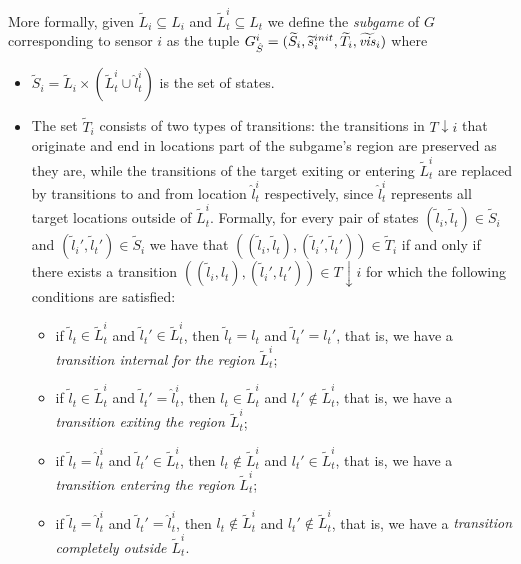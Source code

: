 More formally, given $\widetilde{L}_i \subseteq L_i$ and  $\widetilde{L}^i_t \subseteq L_t$ we define the \emph{subgame} of $G$ corresponding to sensor $i$ as the tuple $G^{i}_{\hat{S}} = (\widetilde{S}_i,\widetilde{s}_i^{init},\widetilde{T}_i,\widetilde{\mathit{vis}}_i)$  where 
\begin{itemize}
\item $\widetilde{S}_i= \widetilde{L}_i \times (\widetilde{L}^i_t \cup \hat{l}^i_t)$ is the set of states.
\item The set $\widetilde{T}_i$ consists of two types of transitions: the transitions in $T{\downarrow } i$ that originate and end in locations part of the subgame's region are preserved as they are, while the transitions of the target exiting or entering $\widetilde{L}^i_t$ are replaced by transitions to and from location $\hat{l}^i_t$ respectively, since $\hat{l}^i_t$ represents all target locations outside of  $\widetilde{L}^i_t$. 
Formally, for every pair of states $(\widetilde{l}_i,\widetilde{l}_t) \in \widetilde{S}_i$ and $(\widetilde{l}_i',\widetilde{l}_t') \in \widetilde{S}_i$ we have that $((\widetilde{l}_i,\widetilde l_t),(\widetilde{l}_i',\widetilde l_t')) \in \widetilde T_i$ if and only if there exists a transition
 $((\widetilde{l}_i,l_t),(\widetilde{l}_i',l_t')) \in T{\downarrow}i$ for which the following conditions are satisfied:
 \begin{itemize}
 \item if $\widetilde l_t \in \widetilde L_t ^i$ and $\widetilde l_t' \in \widetilde L_t ^i$, then 
 $\widetilde l_t = l_t$ and $\widetilde l_t'= l_t'$, that is, we have a \emph{transition internal for the region $\widetilde L_t^i$};
 \item if $\widetilde l_t \in \widetilde L_t ^i$ and $\widetilde l_t' =  \hat l^i_t$, then 
 $l_t \in \widetilde L_t^i$ and $l_t' \not\in \widetilde L_t^i$, that is, we have a \emph{transition exiting the region $\widetilde L_t^i$}; 
 \item if $\widetilde l_t= \hat l^i_t$ and $\widetilde l_t' \in  \widetilde L_t ^i$, then 
 $l_t \not \in \widetilde L_t^i$ and $l_t' \in \widetilde L_t^i$, that is, we have a \emph{transition entering the region $\widetilde L_t^i$}; 
 \item if $\widetilde l_t= \hat l^i_t$ and $\widetilde l_t' =  \hat l^i_t$, then 
 $l_t \not \in \widetilde L_t^i$ and $l_t' \not\in \widetilde L_t^i$, that is, we have a \emph{transition completely outside $\widetilde L_t^i$}.
\end{itemize}  

\end{itemize}
